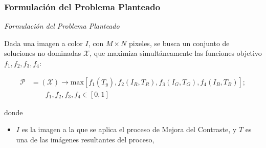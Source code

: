 \documentclass[usenames,dvipsnames]{beamer}
\begin{document}
\begin{frame}
\frametitle{Formulación del Problema Planteado} 
\begin{exampleblock}{\textit{Formulación del Problema Planteado}}

Dada una imagen a color $I$, con $M \times N$ pixeles, se busca un conjunto de soluciones no dominadas $\mathscr{X}$, que maximiza simultáneamente las funciones objetivo $f_1,f_2,f_3,f_4$:

\begin{equation}
\begin{split}
\mathscr{P} &= (\mathscr{X}) \longrightarrow \text{max}[f_1(T_y),f_2(I_R,T_R),f_3(I_G,T_G),f_4(I_B,T_B)]; \\
            & \qquad f_1,f_2,f_3,f_4 \in [0,1]
\end{split}
\end{equation}

\end{exampleblock}

donde

\begin{itemize}
        \item $I$ es la imagen a la que se aplica el proceso de Mejora del Contraste, y $T$\label{symbol:imejorada} es una de las imágenes resultantes del proceso,
\end{itemize}


\end{frame}
\end{document}
